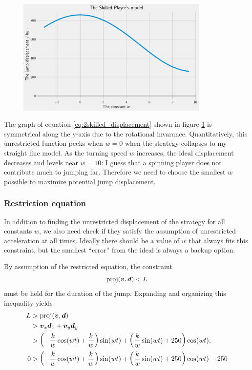 \begin{figure}[H]
    \centering
    \includegraphics[width=0.85\textwidth]{assets/skilled_displacement.png}
    \caption{}
    \label{fig:skilled_displacement}

\end{figure}
The graph of equation \ref{eq:2skilled_displacement} shown in figure \ref{fig:skilled_displacement} is symmetrical along the y-axis due to the rotational invarance. Quantitatively, this unrestricted function peeks when $w=0$ when the strategy collapses to my straight line model. As the turning speed $w$ increases, the ideal displacement decreases and levels near $w=10$: I guess that a spinning player does not contribute much to jumping far. Therefore we need to choose the smallest $w$ possible to maximize potential jump displacement.

\subsubsection{Restriction equation}
In addition to finding the unrestricted displacement of the strategy for all constants $w$, we also need check if they satisfy the assumption of unrestricted acceleration at all times. Ideally there should be a value of $w$ that always fits this constraint, but the smallest ``error'' from the ideal is always a backup option.

By assumption of the restricted equation, the constraint
\[
    \text{proj}(\boldsymbol{v}, \boldsymbol{d}) < L
\]
must be held for the duration of the jump. Expanding and organizing this inequality yields
\begin{align*}
    L &> \text{proj}(\boldsymbol{v}, \boldsymbol{d})\\
    &> \boldsymbol{v}_x \boldsymbol{d}_x + \boldsymbol{v}_y \boldsymbol{d}_y\\
    &> \left(-\frac{k}{w} \cos(wt) + \frac{k}{w}\right) \sin(wt) + \left(\frac{k}{w} \sin(wt) + 250\right) \cos(wt),\\
    0 &> \left(-\frac{k}{w} \cos(wt) + \frac{k}{w}\right) \sin(wt) + \left(\frac{k}{w} \sin(wt) + 250\right) \cos(wt) - 250
\end{align*}

